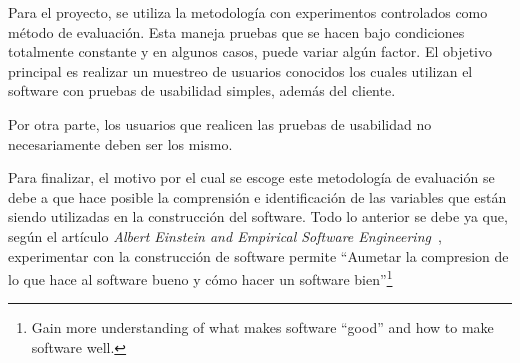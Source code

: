 

Para el proyecto, se utiliza la metodología con experimentos controlados como método de evaluación. Esta maneja pruebas que se hacen bajo condiciones totalmente constante y en algunos casos, puede variar algún factor. El objetivo principal es realizar un muestreo de usuarios conocidos los cuales utilizan el software con pruebas de usabilidad simples, además del cliente.

Por otra parte, los usuarios que realicen las pruebas de usabilidad  no necesariamente deben ser los mismo.

Para finalizar, el motivo por el cual se escoge este metodología de evaluación se debe a que hace posible la comprensión e identificación de las variables que están siendo utilizadas en la construcción del software.  Todo lo anterior se debe ya que, según el artículo \emph{Albert Einstein and Empirical Software Engineering}~\cite{8}, experimentar con la construcción de software permite ``Aumetar la compresion de lo que hace al software bueno y cómo hacer un software bien''\footnote{Gain more understanding of what makes software ``good'' and how to make software well.}

